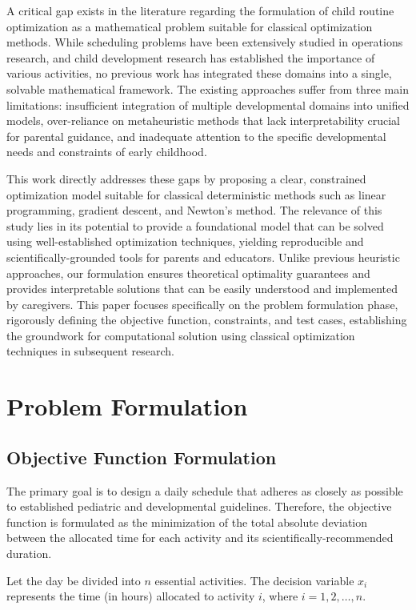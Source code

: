 \documentclass[10pt,conference,compsocconf]{IEEEtran}
\begin{document}
A critical gap exists in the literature regarding the formulation of child routine optimization as a mathematical problem suitable for classical optimization methods. While scheduling problems have been extensively studied in operations research, and child development research has established the importance of various activities, no previous work has integrated these domains into a single, solvable mathematical framework. The existing approaches suffer from three main limitations: insufficient integration of multiple developmental domains into unified models, over-reliance on metaheuristic methods that lack interpretability crucial for parental guidance, and inadequate attention to the specific developmental needs and constraints of early childhood.

This work directly addresses these gaps by proposing a clear, constrained optimization model suitable for classical deterministic methods such as linear programming, gradient descent, and Newton's method. The relevance of this study lies in its potential to provide a foundational model that can be solved using well-established optimization techniques, yielding reproducible and scientifically-grounded tools for parents and educators. Unlike previous heuristic approaches, our formulation ensures theoretical optimality guarantees and provides interpretable solutions that can be easily understood and implemented by caregivers. This paper focuses specifically on the problem formulation phase, rigorously defining the objective function, constraints, and test cases, establishing the groundwork for computational solution using classical optimization techniques in subsequent research.

\section{Problem Formulation}

\subsection{Objective Function Formulation}

The primary goal is to design a daily schedule that adheres as closely as possible to established pediatric and developmental guidelines. Therefore, the objective function is formulated as the minimization of the total absolute deviation between the allocated time for each activity and its scientifically-recommended duration.

Let the day be divided into $n$ essential activities. The decision variable $x_i$ represents the time (in hours) allocated to activity $i$, where $i = 1, 2, \ldots, n$.
\end{document}
